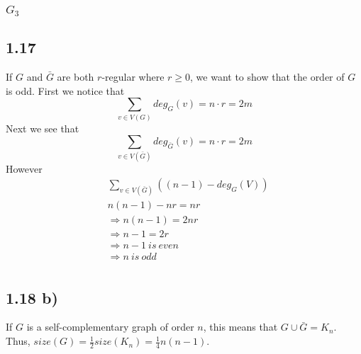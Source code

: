 \documentclass[a4paper]{article}
\begin{document}
\subsubsection*{$G_3$}


\subsection*{1.17}
If $G$ and $\bar G$ are both $r$-regular where $r \geq 0$, we want to
show that the order of $G$ is odd.  First we notice that
\begin{equation} 
    \sum_{v \in V(G)} deg_G(v) = n \cdot r = 2m   
\end{equation}
Next we see that
\begin{equation} 
    \sum_{v \in V(\bar G)} deg_{\bar G}(v) = n \cdot r = 2m   
\end{equation}
However
\begin{eqnarray*} 
    &\sum_{v \in V(\bar G)} ((n-1) - deg_G(V))\\
    &n(n-1) - nr = nr\\
    &\Rightarrow n(n-1) = 2nr\\
    &\Rightarrow n-1 = 2r\\
    &\Rightarrow n-1\ is\ even\\
    &\Rightarrow n\ is\ odd\\
\end{eqnarray*}




\subsection*{1.18 b)}
If $G$ is a self-complementary graph of order $n$, this means that $G \cup \bar G = K_n$.
\newline
Thus, $size(G) = \frac{1}{2} size(K_n) = \frac{1}{4}n(n-1)$.
\end{document}
